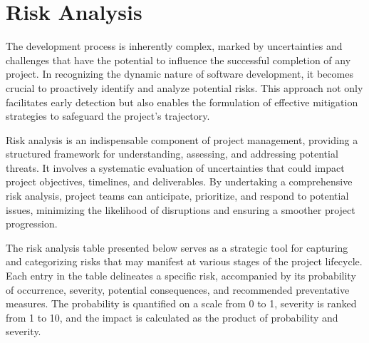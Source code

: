 \chapter{Risk Analysis}

The development process is inherently complex, marked by uncertainties and challenges that have the potential to influence the successful completion of any project. In recognizing the dynamic nature of software development, it becomes crucial to proactively identify and analyze potential risks. This approach not only facilitates early detection but also enables the formulation of effective mitigation strategies to safeguard the project's trajectory.

Risk analysis is an indispensable component of project management, providing a structured framework for understanding, assessing, and addressing potential threats. It involves a systematic evaluation of uncertainties that could impact project objectives, timelines, and deliverables. By undertaking a comprehensive risk analysis, project teams can anticipate, prioritize, and respond to potential issues, minimizing the likelihood of disruptions and ensuring a smoother project progression.

The risk analysis table presented below serves as a strategic tool for capturing and categorizing risks that may manifest at various stages of the project lifecycle. Each entry in the table delineates a specific risk, accompanied by its probability of occurrence, severity, potential consequences, and recommended preventative measures. The probability is quantified on a scale from 0 to 1, severity is ranked from 1 to 10, and the impact is calculated as the product of probability and severity.

